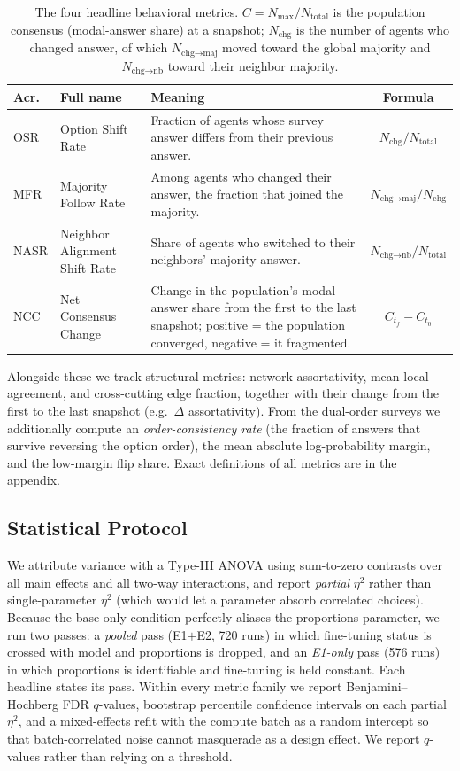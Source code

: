 \documentclass[letterpaper]{article} %
\begin{document}
\begin{table}[t]
\centering
\small
\begin{tabular}{@{}llp{10cm}c@{}}
\toprule
Acr. & Full name & Meaning & Formula \\
\midrule
OSR & Option Shift Rate & Fraction of agents whose survey answer differs from their previous answer. & $N_{\text{chg}}/N_{\text{total}}$ \\[4pt]
MFR & Majority Follow Rate & Among agents who changed their answer, the fraction that joined the majority. & $N_{\text{chg}\to\text{maj}}/N_{\text{chg}}$ \\[4pt]
NASR & Neighbor Alignment Shift Rate & Share of agents who switched to their neighbors' majority answer. & $N_{\text{chg}\to\text{nb}}/N_{\text{total}}$ \\[4pt]
NCC & Net Consensus Change & Change in the population's modal-answer share from the first to the last snapshot; positive = the population converged, negative = it fragmented. & $C_{t_f} - C_{t_0}$ \\
\bottomrule
\end{tabular}
\caption{The four headline behavioral metrics. $C = N_{\max}/N_{\text{total}}$ is the population consensus (modal-answer share) at a snapshot; $N_{\text{chg}}$ is the number of agents who changed answer, of which $N_{\text{chg}\to\text{maj}}$ moved toward the global majority and $N_{\text{chg}\to\text{nb}}$ toward their neighbor majority.}
\label{tab:metrics}
\end{table}

Alongside these we track structural metrics: network assortativity, mean local agreement, and cross-cutting edge fraction, together with their change from the first to the last snapshot (e.g.\ $\Delta$ assortativity). From the dual-order surveys we additionally compute an \emph{order-consistency rate} (the fraction of answers that survive reversing the option order), the mean absolute log-probability margin, and the low-margin flip share. Exact definitions of all metrics are in the appendix.

\subsection{Statistical Protocol}
\label{sec:stats}
We attribute variance with a Type-III ANOVA using sum-to-zero contrasts over all main effects and all two-way interactions, and report \emph{partial} $\eta^2$ rather than single-parameter $\eta^2$ (which would let a parameter absorb correlated choices). Because the base-only condition perfectly aliases the proportions parameter, we run two passes: a \emph{pooled} pass (E1$+$E2, 720 runs) in which fine-tuning status is crossed with model and proportions is dropped, and an \emph{E1-only} pass (576 runs) in which proportions is identifiable and fine-tuning is held constant. Each headline states its pass. Within every metric family we report Benjamini--Hochberg FDR $q$-values, bootstrap percentile confidence intervals on each partial $\eta^2$, and a mixed-effects refit with the compute batch as a random intercept so that batch-correlated noise cannot masquerade as a design effect. We report $q$-values rather than relying on a threshold.
\end{document}
